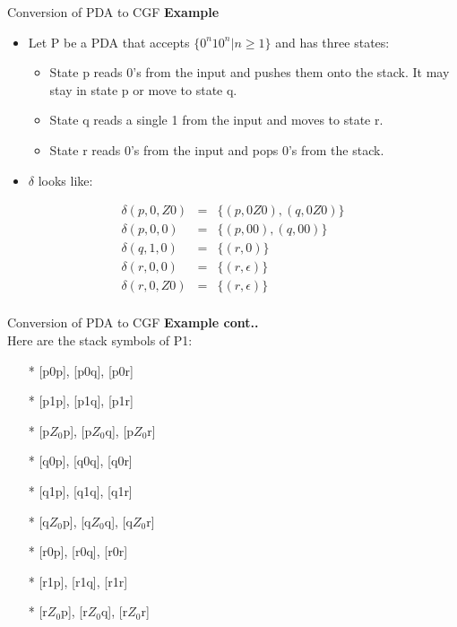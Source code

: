 \documentclass{beamer}
\begin{document}
\begin{frame}{Conversion of PDA to CGF}
	\textbf{Example}
	\begin{itemize}
		\item Let P be a PDA that accepts $\{0^n10^n|n \geq 1\}$ and has three states:
		\begin{itemize}
			\item State p reads 0’s from the input and pushes them onto the stack. It may
			stay in state p or move to state q.
				\item State q reads a single 1 from the input and moves to state r.
			\item State r reads 0’s from the input and pops 0’s from the stack.
		\end{itemize}
	\item $\delta$ looks like:
	\end{itemize}
\begin{eqnarray*}
	\delta(p, 0, Z0) & = & \{(p, 0Z0),(q, 0Z0)\} \\
	\delta(p, 0, 0) & = & \{(p, 00),(q, 00)\} \\
	\delta(q, 1, 0)  &= & \{(r, 0)\} \\
	\delta(r, 0, 0) & = & \{(r, \epsilon)\} \\
	\delta(r, 0, Z0) & = & \{(r, \epsilon)\} \\
\end{eqnarray*}
\end{frame}
\begin{frame}{Conversion of PDA to CGF}
	\textbf{Example cont..}\\
	Here are the stack symbols of P1:
\begin{itemize}
	\item[*] [p0p], [p0q], [p0r] \item[*] [p1p], [p1q], [p1r] \item[*] [p$Z_0$p], [p$Z_0$q], [p$Z_0$r] 
	\item[*] [q0p], [q0q], [q0r] \item[*] [q1p], [q1q], [q1r] \item[*] [q$Z_0$p], [q$Z_0$q], [q$Z_0$r] \item[*]
	[r0p], [r0q], [r0r] \item[*] [r1p], [r1q], [r1r] \item[*] [r$Z_0$p], [r$Z_0$q], [r$Z_0$r] 
\end{itemize}
\end{frame}
\end{document}

